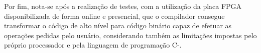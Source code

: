 \documentclass[
	12pt,				%
	oneside,
	a4paper,			%
	english,			%
	french,				%
	spanish,			%
	brazil,				%
	]{abntex2}
\begin{document}
Por fim, nota-se após a realização de testes, com a utilização da placa FPGA disponibilizada de forma online e presencial, que o compilador consegue transformar o código de alto nível para código binário capaz de efetuar as operações pedidas pelo usuário, considerando também as limitações impostas pelo próprio processador e pela linguagem de programação C-.



\postextual


\end{document}
